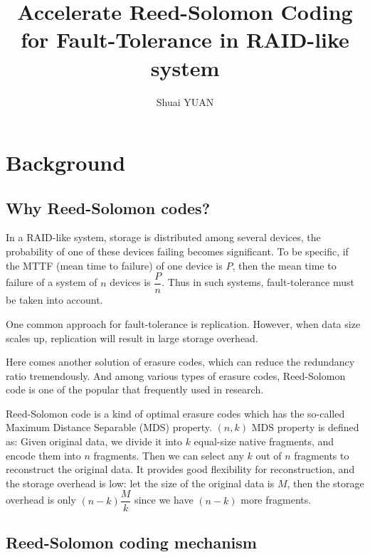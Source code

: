 \documentclass[a4paper]{article}
\title{Accelerate Reed-Solomon Coding for Fault-Tolerance in RAID-like system}
\author{Shuai YUAN}
\date{}
\begin{document}
\maketitle

\section{Background}
\subsection{Why Reed-Solomon codes?}
In a RAID-like system, storage is distributed among several devices, the probability of one of these devices failing becomes significant. 
To be specific, if the MTTF (mean time to failure) of one device is $P$, then the mean time to failure of a system of $n$
devices is $\dfrac{P}{n}$. 
Thus in such systems, fault-tolerance must be taken into account.

One common approach for fault-tolerance is replication. However, when data size scales up, replication will result in large storage overhead.

Here comes another solution of erasure codes, which can reduce the redundancy ratio tremendously.
And among various types of erasure codes, Reed-Solomon code is one of the popular that frequently used in research.

Reed-Solomon code is a kind of optimal erasure codes which has the so-called Maximum Distance Separable (MDS) property.
$(n, k)$ MDS property is defined as:
Given original data, we divide it into $k$ equal-size native fragments, and encode them into $n$ fragments.
Then we can select any $k$ out of $n$ fragments to reconstruct the original data. 
It provides good flexibility for reconstruction, and the storage overhead is low: let the size of the original data is $M$, then the storage overhead is only $(n-k)\dfrac{M}{k}$ since we have $(n-k)$ more fragments.

\subsection{Reed-Solomon coding mechanism}
\end{document}
